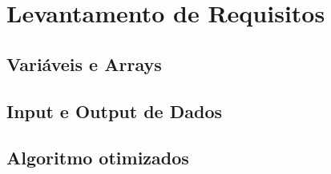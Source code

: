 \chapter{Levantamento de Requisitos}

\section{Variáveis e Arrays}
\section{Input e Output de Dados}
\section{Algoritmo otimizados}